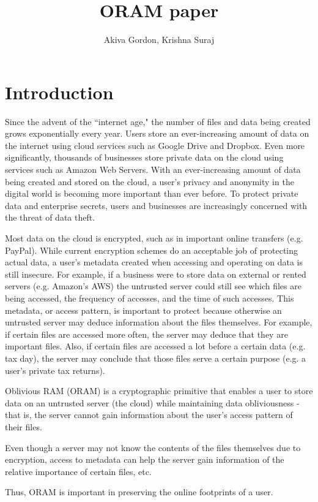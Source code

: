 \documentclass[12pt, oneside]{article}   	%
\title{ORAM paper}
\author{Akiva Gordon, Krishna Suraj}
\date{}							%
\begin{document}
\maketitle
\section{Introduction}
Since the advent of the ``internet age," the number of files and data being created grows exponentially every year. Users store an ever-increasing amount of data on the internet using cloud services such as Google Drive and Dropbox. Even more significantly, thousands of businesses store private data on the cloud using services such as Amazon Web Servers. With an ever-increasing amount of data being created and stored on the cloud, a user's privacy and anonymity in the digital world is becoming more important than ever before. To protect private data and enterprise secrets, users and businesses are increasingly concerned with the threat of data theft.

Most data on the cloud is encrypted, such as in important online transfers (e.g. PayPal). While current encryption schemes do an acceptable job of protecting actual data, a user's metadata created when accessing and operating on data is still insecure. For example, if a business were to store data on external or rented servers (e.g. Amazon's AWS) the untrusted server could still see which files are being accessed, the frequency of accesses, and the time of such accesses. This metadata, or access pattern, is important to protect because otherwise an untrusted server may deduce information about the files themselves. For example, if certain files are accessed more often, the server may deduce that they are important files. Also, if certain files are accessed a lot before a certain data (e.g. tax day), the server may conclude that those files serve a certain purpose (e.g. a user's private tax returns).

Oblivious RAM (ORAM) is a cryptographic primitive that enables a user to store data on an untrusted server (the cloud) while maintaining data obliviousness - that is, the server cannot gain information about the user's access pattern of their files. 

Even though a server may not know the contents of the files themselves due to encryption, access to metadata can help the server gain information of the relative importance of certain files, etc. %

 Thus, ORAM is important in preserving the online footprints of a user. 
\end{document}
